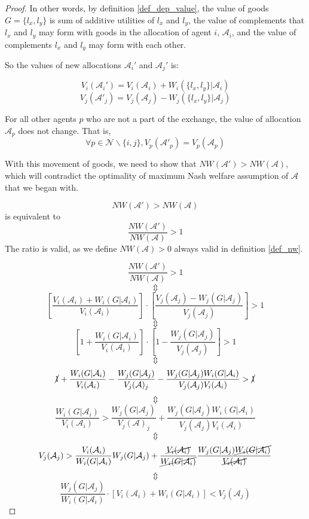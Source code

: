 \begin{proof}
In other words, by definition \ref{def_dep_value}, the value of goods $G = \{l_x, l_y\}$ is sum of additive utilities of $l_x$ and $l_y$, the value of complements that $l_x$ and $l_y$ may form with goods in the allocation of agent $i$, $\mathcal{A}_i$, and the value of complements $l_x$ and $l_y$ may form with each other.

So the values of new allocations $\mathcal{A}_i'$ and $\mathcal{A}_j'$ is:

\[
    V_i(\mathcal{A}_i') = V_i(\mathcal{A}_i) + W_i(\{l_x, l_y\}|\mathcal{A}_i)
\]
\[
    V_j(\mathcal{A}'_j) = V_j(\mathcal{A}_j) - W_j(\{l_x, l_y\}|\mathcal{A}_j)
\]

For all other agents $p$ who are not a part of the exchange, the value of allocation $\mathcal{A}_p$ does not change. That is, 
\[
    \forall p \in \mathcal{N}\backslash\{i,j\}, V_p(\mathcal{A}'_p) = V_p(\mathcal{A}_p)
\]

With this movement of goods, we need to show that $NW(\mathcal{A}') > NW(\mathcal{A})$, which will contradict the optimality of maximum Nash welfare assumption of $\mathcal{A}$ that we began with.

\[
    NW(\mathcal{A}') > NW(\mathcal{A})
\]
is equivalent to
\[
    \frac{NW(\mathcal{A}')}{NW(\mathcal{A})} > 1
\]
The ratio is valid, as we define $NW(\mathcal{A}) > 0$ always valid in definition \ref{def_nw}.

$$
    \frac{NW(\mathcal{A}')}{NW(\mathcal{A})} > 1
$$
$$\Updownarrow $$
$$
    \left[ \frac{V_i(\mathcal{A}_i) + W_i(G|\mathcal{A}_i)}{V_i(\mathcal{A}_i)} \right] \cdot \left[ \frac{V_j(\mathcal{A}_j) - W_j(G|\mathcal{A}_j)}{V_j(\mathcal{A}_j)} \right] > 1
$$
$$\Updownarrow $$
$$
    \left[1 + \frac{W_i(G|\mathcal{A}_i)}{V_i(\mathcal{A}_i)}\right] \cdot \left[1 - \frac{W_j(G|\mathcal{A}_j)}{V_j(\mathcal{A}_j)}\right] > 1
$$
$$\Updownarrow $$
$$
    \cancel{1} + \frac{W_i(G|\mathcal{A}_i)}{V_i(\mathcal{A}_i)} - \frac{W_j(G|\mathcal{A}_j)}{V_j(\mathcal{A})_j} - \frac{W_j(G|\mathcal{A}_j) W_i(G|\mathcal{A}_i)}{V_j(\mathcal{A}_j) V_i(\mathcal{A}_i)} > \cancel{1}
$$
$$\Updownarrow $$
$$
    \frac{W_i(G|\mathcal{A}_i)}{V_i(\mathcal{A}_i)} > \frac{W_j(G|\mathcal{A}_j)}{V_j(\mathcal{A})_j} + \frac{W_j(G|\mathcal{A}_j) W_i(G|\mathcal{A}_i)}{V_j(\mathcal{A}_j) V_i(\mathcal{A}_i)}
$$
$$\Updownarrow $$
$$
    V_j(\mathcal{A}_j) > \frac{V_i(\mathcal{A}_i)}{W_i(G|\mathcal{A}_i)} W_j(G|\mathcal{A}_j) + \frac{\cancel{V_i(\mathcal{A}_i)}}{\cancel{W_i(G|\mathcal{A}_i)}} \frac{W_j(G|\mathcal{A}_j) \cancel{W_i(G|\mathcal{A}_i)}}{\cancel{V_i(\mathcal{A}_i)}}
$$
$$\Updownarrow $$
\begin{equation}
\label{eq_proof_compl_final}
    \frac{W_j(G|\mathcal{A}_j)}{W_i(G|\mathcal{A}_i)} \cdot \left[V_i(\mathcal{A}_i) + W_i(G|\mathcal{A}_i) \right] < V_j(\mathcal{A}_j)
\end{equation}



\end{proof}
